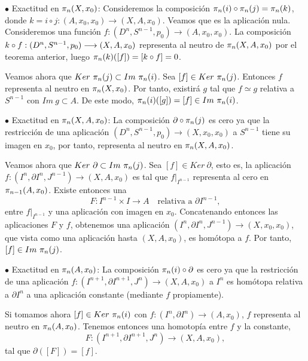 \begin{demo} \par
$\bullet$ Exactitud en $\pi_{n}(X, x_0)$: Consideremos la composición $\pi_{n}(i) \circ \pi_{n}(j) = \pi_{n}(k)$, donde $k = i \circ j : (A, x_0, x_0) \longrightarrow (X, A, x_0)$. Veamos que es la aplicación nula. Consideremos una función $f : (D^n, S^{n-1}, p_0) \longrightarrow (A, x_0, x_0)$. La composición $k \circ \nobreak f : (D^n, S^{n-1}, p_0) \longrightarrow (X, A, x_0)$ representa al neutro de $\pi_{n}(X, A, x_0)$ por el teorema anterior, luego $\pi_{n}(k)([f]) = [k \circ f] = 0 $.  \par
Veamos ahora que $Ker \ \pi_{n}(j) \subset Im \ \pi_{n}(i)$. Sea $[f] \in Ker \ \pi_{n}(j)$. Entonces $f$ representa al neutro en $\pi_{n}(X, x_0)$. Por tanto, existirá $g$ tal que $f \simeq g$ relativa a $S^{n-1}$ con $Im \ g \subset A$. De este modo, $\pi_{n}(i)([g]) = [f] \in Im \ \pi_{n}(i)$. \par

$\bullet$ Exactitud en $\pi_{n}(X, A, x_0)$: La composición $\partial \circ \pi_{n}(j)$ es cero ya que la restricción de una aplicación $(D^n, S^{n-1}, p_0) \longrightarrow (X, x_0, x_0)$ a $S^{n-1}$ tiene su imagen en $x_0$, por tanto, representa al neutro en $\pi_{n}(X, A, x_0)$. \par
Veamos ahora que $Ker \ \partial \subset Im \ \pi_{n}(j)$. Sea $[f] \in Ker \ \partial$, esto es, la aplicación $f : (I^n, \partial I^n, J^{n-1}) \longrightarrow (X, A, x_0)$ es tal que $f \vert_{I^{n-1}}$ representa al cero en $\pi_{n-1}(A, x_0)$. Existe entonces una 
\[
F : I^{n-1} \times I \longrightarrow A \quad \text{relativa a } \partial I^{n-1},
\]
entre $f \vert_{I^{n-1}}$ y una aplicación con imagen en $x_0$. Concatenando entonces las aplicaciones $F$ y $f$, obtenemos una aplicación $(I^n, \partial I^n, J^{n-1}) \longrightarrow (X, x_0, x_0)$, que vista como una aplicación hasta $(X, A, x_0)$, es homótopa a $f$. Por tanto, $[f] \in Im \ \homot{n}{j}$.

$\bullet$ Exactitud en $\pi_{n}(A, x_0)$: La composición $\pi_{n}(i) \circ \partial$ es cero ya que la restricción de una aplicación $f : (I^{n+1}, \partial I^{n+1}, J^n) \longrightarrow(X, A, x_0)$ a $I^n$ es homótopa relativa a $\partial I^n$ a una aplicación constante (mediante $f$ propiamente). \par
Si tomamos ahora $[f] \in Ker \ \homot{n}{i}$ con $f : (I^n, \partial I^n) \longrightarrow (A, x_0)$, $f$ representa al neutro en $\pi_{n}(A, x_0)$. Tenemos entonces una homotopía entre $f$ y la constante,
\[
F : (I^{n+1}, \partial I^{n+1}, J^n) \longrightarrow (X, A, x_0),
\]
tal que $\partial ([F]) = [f]$.
\end{demo}

